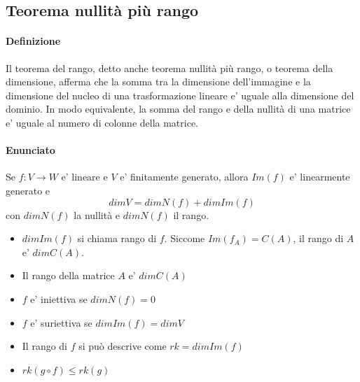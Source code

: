 \documentclass[a4paper, 10pt]{article}
\begin{document}
	\subsection{Teorema nullità più rango}
	\paragraph*{Definizione} Il teorema del rango, detto anche teorema nullità più rango, o teorema della
							 dimensione, afferma che la somma tra la dimensione dell'immagine e la dimensione
							 del nucleo di una trasformazione lineare e' uguale alla dimensione del dominio.
							 In modo equivalente, la somma del rango e della nullità di una matrice e' uguale 
							 al numero di colonne della matrice.
	\paragraph*{Enunciato} Se $f:V \rightarrow W$ e' lineare e $V$ e' finitamente generato, allora $Im(f)$ 
						   e' linearmente generato e  \[ dimV = dimN(f) + dimIm(f) \] con $dimN(f)$ la 
						   nullità e $dimN(f)$ il rango.
	\begin{itemize}
		\item $dimIm(f)$ si chiama rango di $f$. Siccome $Im(f_A) = C(A)$, il rango di $A$ e' $dimC(A)$.
		\item Il rango della matrice $A$ e' $dimC(A)$
		\item $f$ e' iniettiva se $dimN(f) = 0$
		\item $f$ e' suriettiva se $dimIm(f) = dimV$
		\item Il rango di $f$ si può descrive come $rk = dimIm(f)$
		\item $rk(g \circ f) \leq rk(g)$
	\end{itemize}
	
	
\end{document}
